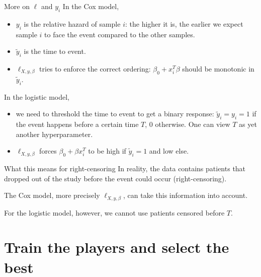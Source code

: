 \documentclass[10pt, aspectratio=169]{beamer}
\begin{document}
\begin{frame}{More on $\ell$ and $y_i$}
  In the \alert{Cox} model,
  \begin{itemize}
    \item $y_i$ is the \alert{relative hazard} of sample $i$: the higher it is, the earlier we 
      expect sample $i$ to face the event compared to the other samples.
    \item $\tilde{y}_i$ is the time to event.
    \item $\ell_{X, y, \beta}$ tries to enforce the correct ordering: $\beta_0 + x_i^T \beta$ 
      should be monotonic in $\tilde{y}_i$.
  \end{itemize}

  In the \alert{logistic} model,
  \begin{itemize}
    \item we need to \alert{threshold the time to event} to get a \alert{binary response}: 
      $\tilde{y}_i = y_i = 1$ if the event happens before a certain time $T$, $0$ otherwise. 
      One can view \alert{$T$} as yet \alert{another hyperparameter}.
    \item $\ell_{X, y, \beta}$ forces $\beta_0 + \beta x_i^T$ to be high if 
      $\tilde{y}_i = 1$ and low else.
  \end{itemize}
\end{frame}

\begin{frame}{What this means for right-censoring}
  In reality, the data contains patients that dropped out of the study before the event could 
  occur (right-censoring).

  The Cox model, more precisely $\ell_{X, y, \beta}$, can take this information into 
  account.

  For the logistic model, however, we cannot use patients censored before $T$.
\end{frame}

\section{Train the players and select the best}
\end{document}
